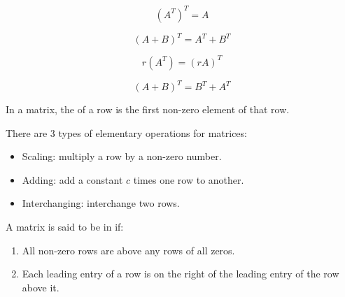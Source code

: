       \[
        (A^{T})^{T} = A
      \]

      \[
        (A + B)^{T} = A^{T} + B^{T}
      \]

      \[
        r(A^{T}) = (rA)^{T}
      \]

      \[
        (A + B)^{T} = B^{T} + A^{T}
      \]


    \par In a matrix, the  of a row is the first non-zero
    element of that row.
    \par There are 3 types of elementary operations for matrices:
    \begin{itemize}
      \item Scaling: multiply a row by a non-zero number.
      \item Adding: add a constant $c$ times one row to another.
      \item Interchanging: interchange two rows.
    \end{itemize}
    \par A matrix is said to be in  if:
    \begin{enumerate}
      \item All non-zero rows are above any rows of all zeros.
      \item Each leading entry of a row is on the right of the leading entry
        of the row above it.
    \end{enumerate}

